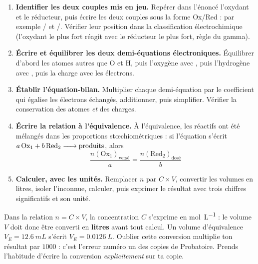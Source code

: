 \documentclass[11pt]{article}
\begin{document}
\begin{methode}
\begin{enumerate}
\item \textbf{Identifier les deux couples mis en jeu.} Repérer dans l'énoncé l'oxydant et le réducteur, puis écrire les deux couples sous la forme Ox/Red : par exemple / et /. Vérifier leur position dans la classification électrochimique (l'oxydant le plus fort réagit avec le réducteur le plus fort, règle du gamma).
\item \textbf{Écrire et équilibrer les deux demi-équations électroniques.} Équilibrer d'abord les atomes autres que O et H, puis l'oxygène avec , puis l'hydrogène avec , puis la charge avec les électrons.
\item \textbf{Établir l'équation-bilan.} Multiplier chaque demi-équation par le coefficient qui égalise les électrons échangés, additionner, puis simplifier. Vérifier la conservation des atomes \emph{et} des charges.
\item \textbf{Écrire la relation à l'équivalence.} À l'équivalence, les réactifs ont été mélangés dans les proportions stœchiométriques : si l'équation s'écrit $a\,\text{Ox}_1 + b\,\text{Red}_2 \ce{->} \text{produits}$, alors
\[ \frac{n(\text{Ox}_1)_{\text{versé}}}{a} = \frac{n(\text{Red}_2)_{\text{dosé}}}{b} \]
\item \textbf{Calculer, avec les unités.} Remplacer $n$ par $C \times V$, convertir les volumes en litres, isoler l'inconnue, calculer, puis exprimer le résultat avec trois chiffres significatifs et son unité.
\end{enumerate}
\end{methode}

\begin{attention}
Dans la relation $n = C \times V$, la concentration $C$ s'exprime en \si{mol.L^{-1}} : le volume $V$ doit donc être converti en \textbf{litres} avant tout calcul. Un volume d'équivalence $V_E = \SI{12,6}{mL}$ s'écrit $V_E = \SI{0,0126}{L}$. Oublier cette conversion multiplie ton résultat par $1000$ : c'est l'erreur numéro un des copies de Probatoire. Prends l'habitude d'écrire la conversion \emph{explicitement} sur ta copie.
\end{attention}
\end{document}
